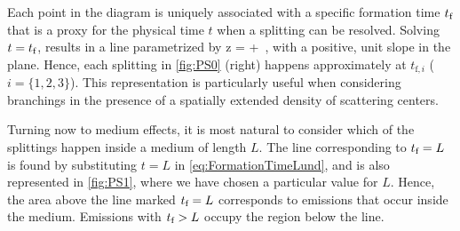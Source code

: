 Each point in the diagram is uniquely associated with a specific formation time $t_\text{f}$ that is a proxy for the physical time $t$ when a splitting can be resolved.
Solving $t = t_\text{f}$, results in a line parametrized by
\beq
\label{eq:FormationTimeLund}
\log z \theta = \log {} + \log {} \,,
\eeq
with a positive, unit slope in the plane.
Hence, each splitting in \autoref{fig:PS0} (right) happens approximately at $t_{\text{f},i}$ ($i=\{1,2,3\}$). This representation is particularly useful when considering branchings in the presence of a spatially extended density of scattering centers.

Turning now to medium effects, it is most natural to consider which of the splittings happen inside a medium of length $L$.  The line corresponding to $t_\text{f} = L$ is found by substituting $t = L$ in \eqref{eq:FormationTimeLund}, and is also represented in \autoref{fig:PS1}, where we have chosen a particular value for $L$. Hence, the area above the line marked $t_\text{f} = L$ corresponds to emissions that occur inside the medium. Emissions with $t_\text{f} > L$ occupy the region below the line.

